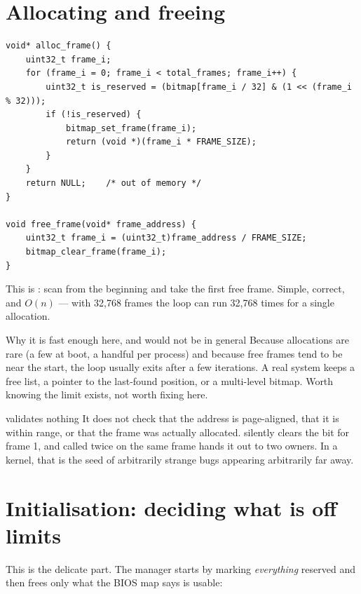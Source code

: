 \section{Allocating and freeing}

\begin{lstlisting}[style=c]
void* alloc_frame() {
    uint32_t frame_i;
    for (frame_i = 0; frame_i < total_frames; frame_i++) {
        uint32_t is_reserved = (bitmap[frame_i / 32] & (1 << (frame_i % 32)));
        if (!is_reserved) {
            bitmap_set_frame(frame_i);
            return (void *)(frame_i * FRAME_SIZE);
        }
    }
    return NULL;    /* out of memory */
}

void free_frame(void* frame_address) {
    uint32_t frame_i = (uint32_t)frame_address / FRAME_SIZE;
    bitmap_clear_frame(frame_i);
}
\end{lstlisting}

This is : scan from the beginning and take the first free frame. Simple, correct,
and $O(n)$ --- with 32,768 frames the loop can run 32,768 times for a single allocation.

\begin{warn}{Why it is fast enough here, and would not be in general}
Because allocations are rare (a few at boot, a handful per process) and because free frames tend to
be near the start, the loop usually exits after a few iterations. A real system keeps a free list, a
pointer to the last-found position, or a multi-level bitmap. Worth knowing the limit exists, not
worth fixing here.
\end{warn}

\begin{danger}{ validates nothing}
It does not check that the address is page-aligned, that it is within range, or that the frame was
actually allocated.  silently clears the bit for frame 1, and
 called twice on the same frame hands it out to two owners. In a kernel, that is
the seed of arbitrarily strange bugs appearing arbitrarily far away.
\end{danger}

\section{Initialisation: deciding what is off limits}

This is the delicate part. The manager starts by marking \emph{everything} reserved and then frees
only what the BIOS map says is usable:

